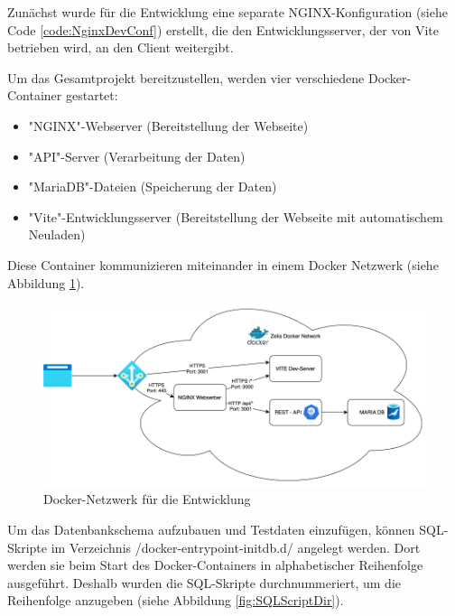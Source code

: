
Zunächst wurde für die Entwicklung eine separate NGINX-Konfiguration (siehe Code \ref{code:NginxDevConf}) erstellt, die den Entwicklungsserver, der von Vite betrieben wird, an den Client weitergibt.


Um das Gesamtprojekt bereitzustellen, werden vier verschiedene Docker-Container gestartet:

\begin{itemize}
    \item "NGINX"-Webserver (Bereitstellung der Webseite)
    \item "API"-Server (Verarbeitung der Daten)
    \item "MariaDB"-Dateien (Speicherung der Daten)
    \item "Vite"-Entwicklungsserver (Bereitstellung der Webseite mit automatischem Neuladen)
\end{itemize}

Diese Container kommunizieren miteinander in einem Docker Netzwerk (siehe Abbildung \ref{fig:DockerDevNetwork}). 

\begin{figure}[H]
    \centering
    \includegraphics{media/Docker/DevNetwork.png}
    \caption{Docker-Netzwerk für die Entwicklung}
    \label{fig:DockerDevNetwork}
\end{figure}

Um das Datenbankschema aufzubauen und Testdaten einzufügen, können SQL-Skripte im Verzeichnis {\ttfamily /docker-entrypoint-initdb.d/} angelegt werden. Dort werden sie beim Start des Docker-Containers in alphabetischer Reihenfolge ausgeführt. Deshalb wurden die SQL-Skripte durchnummeriert, um die Reihenfolge anzugeben (siehe Abbildung \ref{fig:SQLScriptDir}).

